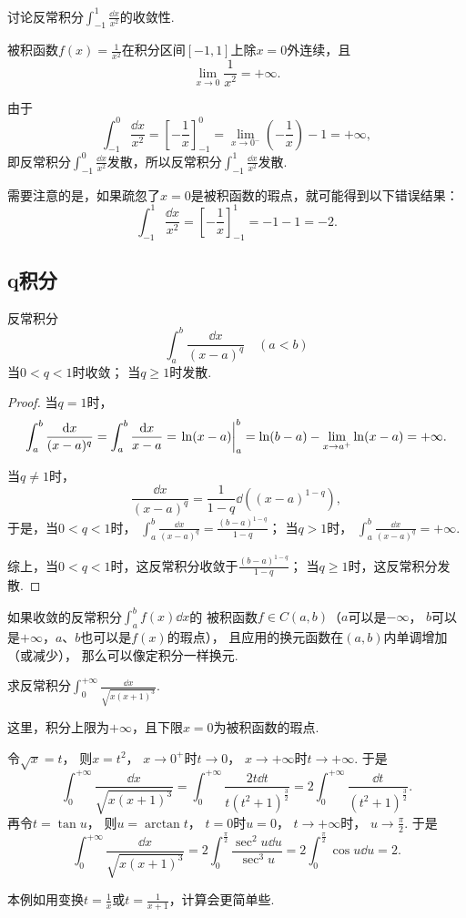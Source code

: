 \begin{example}
讨论反常积分\(\int_{-1}^1 \frac{\dd{x}}{x^2}\)的收敛性.
\begin{solution}
被积函数\(f(x) = \frac{1}{x^2}\)在积分区间\([-1,1]\)上除\(x=0\)外连续，且\[
\lim\limits_{x\to0} \frac{1}{x^2} = +\infty.
\]

由于\[
\int_{-1}^0 \frac{\dd{x}}{x^2}
= \left[-\frac{1}{x}\right]_{-1}^0
= \lim\limits_{x\to0^-} \left(-\frac{1}{x}\right) - 1
= +\infty,
\]即反常积分\(\int_{-1}^0 \frac{\dd{x}}{x^2}\)发散，所以反常积分\(\int_{-1}^1 \frac{\dd{x}}{x^2}\)发散.
\end{solution}

需要注意的是，如果疏忽了\(x=0\)是被积函数的瑕点，就可能得到以下错误结果：\[
\int_{-1}^1 \frac{\dd{x}}{x^2}
= \left[ -\frac{1}{x} \right]_{-1}^1
= -1 - 1 = -2.
\]
\end{example}

\subsection{q积分}
\begin{proposition}[q积分]\label{example:定积分.q积分}
反常积分\[
	\int_a^b \frac{\dd{x}}{(x-a)^q}
	\quad(a<b)
\]
当\(0 < q < 1\)时收敛；
当\(q \geq 1\)时发散.
\begin{proof}
当\(q=1\)时，\[
	\int_a^b \frac{\dd{x}}{(x-a)^q}
	= \int_a^b \frac{\dd{x}}{x-a}
	= \eval{\ln(x-a)}_a^b
	= \ln(b-a) - \lim\limits_{x \to a^+} \ln(x-a)
	= +\infty.
\]

当\(q\neq1\)时，\[
	\frac{\dd{x}}{(x-a)^q}
	= \frac{1}{1-q} \dd((x-a)^{1-q}),
\]
于是，当\(0<q<1\)时，
\(\int_a^b \frac{\dd{x}}{(x-a)^q}
= \frac{(b-a)^{1-q}}{1-q}\)；
当\(q>1\)时，
\(\int_a^b \frac{\dd{x}}{(x-a)^q}
= +\infty\).

综上，当\(0<q<1\)时，这反常积分收敛于\(\frac{(b-a)^{1-q}}{1-q}\)；
当\(q\geq1\)时，这反常积分发散.
\end{proof}
\end{proposition}

如果收敛的反常积分\(\int_a^b f(x) \dd{x}\)的%
被积函数\(f \in C(a,b)\)（\(a\)可以是\(-\infty\)，
\(b\)可以是\(+\infty\)，\(a\)、\(b\)也可以是\(f(x)\)的瑕点），
且应用的换元函数在\((a,b)\)内单调增加（或减少），
那么可以像定积分一样换元.

\begin{example}
求反常积分\(\int_0^{+\infty} \frac{\dd{x}}{\sqrt{x(x+1)^3}}\).
\begin{solution}
这里，积分上限为\(+\infty\)，且下限\(x=0\)为被积函数的瑕点.

令\(\sqrt{x} = t\)，
则\(x = t^2\)，
\(x\to0^+\)时\(t\to0\)，
\(x\to+\infty\)时\(t\to+\infty\).
于是\[
	\int_0^{+\infty} \frac{\dd{x}}{\sqrt{x(x+1)^3}}
	= \int_0^{+\infty} \frac{2t\dd{t}}{t(t^2+1)^{\frac32}}
	= 2 \int_0^{+\infty} \frac{\dd{t}}{(t^2+1)^{\frac32}}.
\]
再令\(t = \tan u\)，
则\(u = \arctan t\)，
\(t=0\)时\(u=0\)，
\(t\to+\infty\)时，
\(u\to\frac\pi2\).
于是\[
	\int_0^{+\infty} \frac{\dd{x}}{\sqrt{x(x+1)^3}}
	= 2 \int_0^{\frac\pi2} \frac{\sec^2 u \dd{u}}{\sec^3 u}
	= 2 \int_0^{\frac\pi2} \cos u \dd{u}
	= 2.
\]
\end{solution}
本例如用变换\(t = \frac{1}{x}\)或\(t = \frac{1}{x+1}\)，计算会更简单些.
\end{example}

